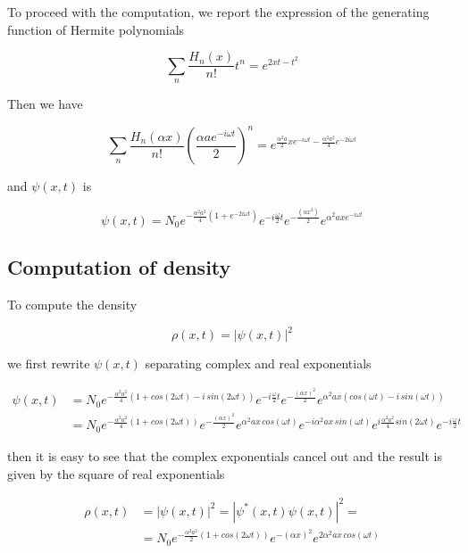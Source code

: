 \documentclass{article}
\begin{document}
To proceed with the computation, we report the expression of the generating function of Hermite polynomials

\begin{equation}
\sum_n \frac{H_n(x)}{n!} t^n = e^{2xt-t^2}
\end{equation}

Then we have

\[
\sum_n \frac{H_n(\alpha x)}{n!} \left( \frac{\alpha a e^{-i\omega t}}{2} \right)^n = e^{\frac{\alpha^2 a}{2} x e^{-i \omega t} - \frac{\alpha^2 a^2}{4}e^{-2i \omega t}}
\]

and \( \psi(x,t) \) is

\begin{equation}
\psi(x,t) = N_0 e^{-\frac{\alpha^2 a^2}{4}\left( 1 + e^{-2i \omega t} \right)} e^{-i \frac{\omega}{2} t} e^{-\frac{(\alpha x^2)}{2}} e^{\alpha^2 a x e^{-i \omega t}}
\end{equation}

\subsection{Computation of density}
To compute the density

\begin{equation}
\rho(x,t) = |\psi(x,t)|^2
\end{equation}

we first rewrite \( \psi(x,t) \) separating complex and real exponentials

\begin{align}
\psi(x,t) & = N_0 e^{-\frac{\alpha^2 a^2}{4}\left(1 + cos(2\omega t) - i \, sin(2 \omega t) \right)} e^{-i \frac{\omega}{2} t} e^{-\frac{(\alpha x)^2}{2}} e^{\alpha^2 a x (cos(\omega t) - i \, sin(\omega t))} \nonumber \\
& = N_0 e^{-\frac{\alpha^2 a^2}{4}\left(1 + cos(2\omega t) \right)} e^{-\frac{(\alpha x)^2}{2}} e^{\alpha^2 a x \, cos(\omega t)} e^{-i \alpha^2 a x \, sin(\omega t)} e^{i \frac{\alpha^2 a^2}{4}sin(2\omega t)} e^{-i \frac{\omega}{2} t}
\end{align}

then it is easy to see that the complex exponentials cancel out and the result is given by the square of real exponentials

\begin{align}
\rho(x,t) & = |\psi(x,t)|^2 = |\psi^*(x,t) \psi(x,t)|^2 = \nonumber \\
& = N_0 e^{-\frac{\alpha^2 a^2}{2}\left(1 + cos(2\omega t) \right)} e^{-(\alpha x)^2} e^{2 \alpha^2 a x \, cos(\omega t)}
\end{align}
\end{document}
